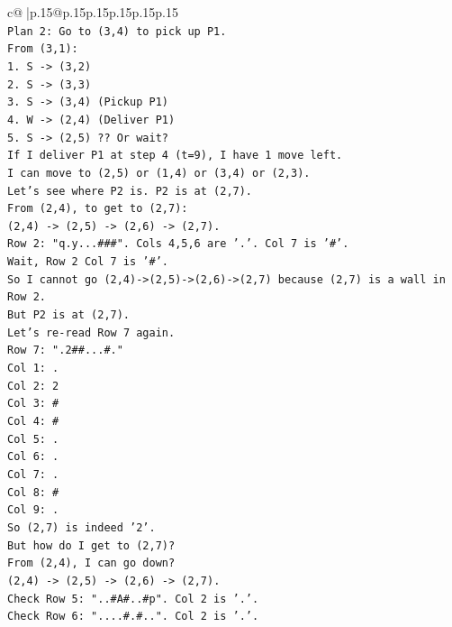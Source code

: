 \documentclass{article}
\begin{document}
{\begin{supertabular}{c@{$\;$}|p{.15\linewidth}@{}p{.15\linewidth}p{.15\linewidth}p{.15\linewidth}p{.15\linewidth}p{.15\linewidth}}
{{{\\ 
\texttt{Plan 2: Go to (3,4) to pick up P1.} \\
\texttt{From (3,1):} \\
\texttt{1. S {-}> (3,2)} \\
\texttt{2. S {-}> (3,3)} \\
\texttt{3. S {-}> (3,4) (Pickup P1)} \\
\texttt{4. W {-}> (2,4) (Deliver P1)} \\
\texttt{5. S {-}> (2,5) ?? Or wait?} \\
\texttt{If I deliver P1 at step 4 (t=9), I have 1 move left.} \\
\texttt{I can move to (2,5) or (1,4) or (3,4) or (2,3).} \\
\texttt{Let's see where P2 is. P2 is at (2,7).} \\
\texttt{From (2,4), to get to (2,7):} \\
\texttt{(2,4) {-}> (2,5) {-}> (2,6) {-}> (2,7).} \\
\texttt{Row 2: "q.y...\#\#\#". Cols 4,5,6 are '.'. Col 7 is '\#'.} \\
\texttt{Wait, Row 2 Col 7 is '\#'.} \\
\texttt{So I cannot go (2,4){-}>(2,5){-}>(2,6){-}>(2,7) because (2,7) is a wall in Row 2.} \\
\texttt{But P2 is at (2,7).} \\
\texttt{Let's re{-}read Row 7 again.} \\
\texttt{Row 7: ".2\#\#...\#."} \\
\texttt{Col 1: .} \\
\texttt{Col 2: 2} \\
\texttt{Col 3: \#} \\
\texttt{Col 4: \#} \\
\texttt{Col 5: .} \\
\texttt{Col 6: .} \\
\texttt{Col 7: .} \\
\texttt{Col 8: \#} \\
\texttt{Col 9: .} \\
\texttt{So (2,7) is indeed '2'.} \\
\texttt{But how do I get to (2,7)?} \\
\texttt{From (2,4), I can go down?} \\
\texttt{(2,4) {-}> (2,5) {-}> (2,6) {-}> (2,7).} \\
\texttt{Check Row 5: "..\#A\#..\#p". Col 2 is '.'.} \\
\texttt{Check Row 6: "....\#.\#..". Col 2 is '.'.} \\
}}}
\end{supertabular}}
\end{document}
